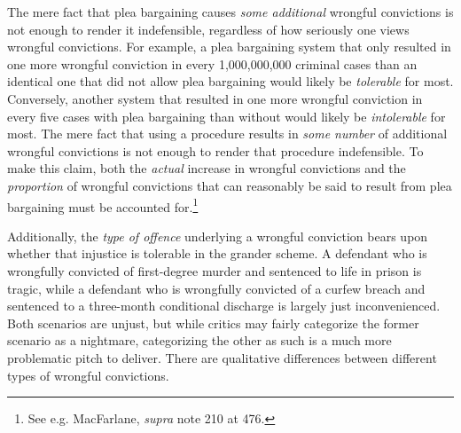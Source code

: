 The mere fact that plea bargaining causes \textit{some additional} wrongful convictions is not enough to render it indefensible, regardless of how seriously one views wrongful convictions. For example, a plea bargaining system that only resulted in one more wrongful conviction in every 1,000,000,000 criminal cases than an identical one that did not allow plea bargaining would likely be \textit{tolerable} for most. Conversely, another system that resulted in one more wrongful conviction in every five cases with plea bargaining than without would likely be \textit{intolerable} for most. The mere fact that using a procedure results in \textit{some number} of additional wrongful convictions is not enough to render that procedure indefensible. To make this claim, both the \textit{actual} increase in wrongful convictions and the \textit{proportion} of wrongful convictions that can reasonably be said to result from plea bargaining must be accounted for.\footnote{See e.g. MacFarlane, \textit{supra} note 210 at 476.}

Additionally, the \textit{type of offence} underlying a wrongful conviction bears upon whether that injustice is tolerable in the grander scheme. A defendant who is wrongfully convicted of first-degree murder and sentenced to life in prison is tragic, while a defendant who is wrongfully convicted of a curfew breach and sentenced to a three-month conditional discharge is largely just inconvenienced. Both scenarios are unjust, but while critics may fairly categorize the former scenario as a nightmare, categorizing the other as such is a much more problematic pitch to deliver. There are qualitative differences between different types of wrongful convictions.

